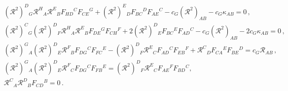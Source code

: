 \documentclass[12pt]{article}
\def\RR{{\mathfrak R}}
\def\RR{{\mathfrak R}}
\def\R{{\mathbb R}}
\renewcommand{\R}{\mathcal{R}}
\renewcommand{\RR}{(\mathcal{R}^{2})}
\begin{document}
\begin{align}
&\RR^{D}{}_{G} \R^{H}{}_{A} \R^{E}{}_{B}  F_{HD}{}^{C}F_{CE}{}^{G}  + \RR^{E}{}_{D} F_{BC}{}^{D}F_{AE}{}^{C} - c_G \RR_{AB}  - c_G \kappa_{AB} = 0\,, \\
&\RR^{C}{}_{G} \RR^{D}{}_{F} \R^{H}{}_{A} \R^{E}{}_{B}  F_{DE}{}^{G} F_{CH}{}^{F}  + 2\RR^{D}{}_{E} F_{BC}{}^{E}F_{AD}{}^{C} - c_G \RR_{AB} - 2 c_G \kappa_{AB} = 0\,, \\
& \RR^{G}{}_{A} \RR^{D}{}_{E} \R^{F}{}_{B}  F_{DG}{}^C F_{FC}{}^E - \RR^{D}{}_{F} \R^{E}{}_{C} F_{AD}{}^C F_{EB}{}^F +\R^{C}{}_{D} F_{CA}{}^E F_{BE}{}^D  = c_G \R_{AB}\,, \\
&\RR^{G}{}_{A} \RR^{D}{}_{E} \R^{F}{}_{C} F_{DG}{}^C F_{FB}{}^E = \RR^{D}{}_{F}\R^{E}{}_{C} F_{AE}{}^F F_{BD}{}^C,\\
&  \R^{C}{}_{A} \R^{D}{}_{B} F_{CD}{}^{B} = 0\,.
\end{align}
\endgroup
\end{document}

